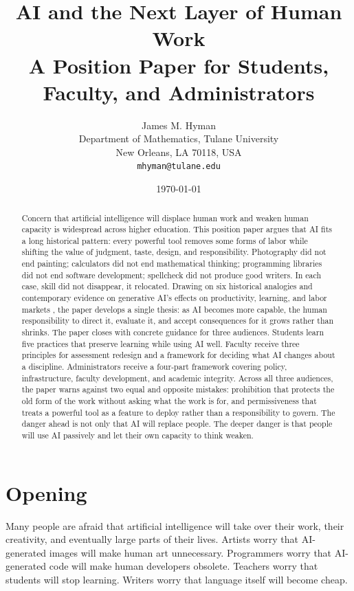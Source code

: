 \documentclass[12pt]{article}
\title{AI and the Next Layer of Human Work \\[0.4em]
\large A Position Paper for Students, Faculty, and Administrators}
\author{James M. Hyman \\
\small Department of Mathematics, Tulane University \\
\small New Orleans, LA 70118, USA \\
\small \texttt{mhyman@tulane.edu}}
\date{\today}
\begin{document}
\maketitle

\begin{abstract}
\noindent
Concern that artificial intelligence will displace human work and weaken human capacity is widespread across higher education. This position paper argues that AI fits a long historical pattern: every powerful tool removes some forms of labor while shifting the value of judgment, taste, design, and responsibility. Photography did not end painting; calculators did not end mathematical thinking; programming libraries did not end software development; spellcheck did not produce good writers. In each case, skill did not disappear, it relocated. Drawing on six historical analogies and contemporary evidence on generative AI's effects on productivity, learning, and labor markets \citep{noy2023experimental, brynjolfsson2025generative, dellacqua2023navigating}, the paper develops a single thesis: as AI becomes more capable, the human responsibility to direct it, evaluate it, and accept consequences for it grows rather than shrinks. The paper closes with concrete guidance for three audiences. Students learn five practices that preserve learning while using AI well. Faculty receive three principles for assessment redesign and a framework for deciding what AI changes about a discipline. Administrators receive a four-part framework covering policy, infrastructure, faculty development, and academic integrity. Across all three audiences, the paper warns against two equal and opposite mistakes: prohibition that protects the old form of the work without asking what the work is for, and permissiveness that treats a powerful tool as a feature to deploy rather than a responsibility to govern. The danger ahead is not only that AI will replace people. The deeper danger is that people will use AI passively and let their own capacity to think weaken.
\end{abstract}

\section*{Opening}

Many people are afraid that artificial intelligence will take over their work, their creativity, and eventually large parts of their lives. Artists worry that AI-generated images will make human art unnecessary. Programmers worry that AI-generated code will make human developers obsolete. Teachers worry that students will stop learning. Writers worry that language itself will become cheap.
\end{document}
